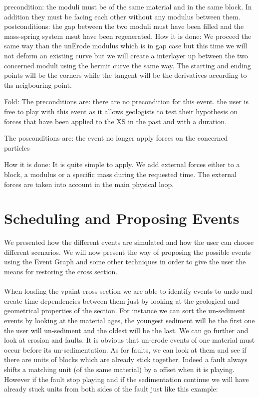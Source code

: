 \documentclass[12pt, a4paper]{memoir} %
\begin{document}
		precondition: the moduli must be of the same material and in the same block. In addition they must be facing each other without any modulus between them. 
		postconditions: the gap between the two moduli must have been filled and the mass-spring system msut have been regenerated.
		How it is done: We proceed the same way than the unErode modulus which is in gap case but this time we will not deform an existing curve but we will create a interlayer up between the two concerned moduli using the hermit curve the same way. The starting and ending points will be the corners while the tangent will be the derivatives according to ths neigbouring point.
		
Fold:
	The preconditions are: there are no precondition for this event. the user is free to play with this event as it allows geologists to test their hypothesis on forces that have been applied to the XS in the past and with a duration.
	
	The posconditions are: the event no longer apply forces on the concerned particles
	
	How it is done: It is quite simple to apply. We add external forces either to a block, a modulus or a specific mass during the requested time. The external forces are taken into account in the main physical loop.
	

\section{Scheduling and Proposing Events}

We presented how the different events are simulated and how the user can choose different scenarios. We will now present the way of proposing the possible events using the Event Graph and some other techniques in order to give the user the means for restoring the cross section.\\\\

When loading the vpaint cross section we are able to identify events to undo  and create time dependencies between them just by looking at the geological and geometrical properties of the section. For instance we can sort the un-sediment events by looking at the material ages, the youngest sediment will be the first one the user will un-sediment and the oldest will be the last. We can go further and look at erosion and faults. It is obvious that un-erode events of one material must occur before its un-sedimentation. As for faults, we can look at them and see if there are units of blocks which are already stick together. Indeed a fault always shifts a matching unit (of the same material) by a offset when it is playing. However if the fault stop playing and if the sedimentation continue we will have already stuck units from both sides of the fault just like this example:\\\\
\end{document}
